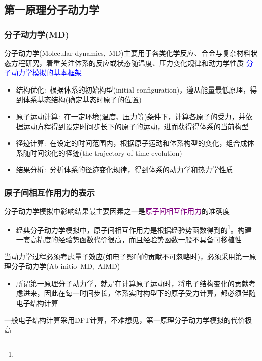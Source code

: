 \subsection{第一原理分子动力学}
\frame
{
	\frametitle{分子动力学\textrm{(MD)}}
	分子动力学\textrm{(Molecular dynamics,~MD)}主要用于各类化学反应、合金与复杂材料状态方程研究，着重关注体系的反应或状态随温度、压力变化规律和动力学性质
\vskip 5pt
\textcolor{blue}{分子动力学模拟的基本框架}
	\begin{itemize}
		\item 结构优化:~根据体系的初始构型\textrm{(initial configuration)}，遵从能量最低原理，得到体系基态结构(确定基态时原子的位置)
		\item 原子运动计算:~在一定环境(温度、压力等)条件下，计算各原子的受力，并依据运动方程得到设定时间步长下的原子的运动，进而获得得体系的当前构型
		\item 径迹计算:~在设定的时间范围内，根据原子运动和体系构型的变化，组合成体系随时间演化的径迹\textrm{(the trajectory of time evolution)}
		\item 结果分析:~分析体系的径迹变化规律，得到体系的动力学和热力学性质
	\end{itemize}
}

\frame
{
	\frametitle{原子间相互作用力的表示}
	分子动力学模拟中影响结果最主要因素之一是\textcolor{purple}{原子间相互作用力}的准确度
\vskip 5pt
\begin{itemize}
	\item 经典分子动力学模拟中，原子间相互作用力是根据经验势函数得到的\footnote{\fontsize{6.2pt}{4.2pt}\selectfont{经验势函数也称为力场，是参数化形式给出的原子间相互作用，一般通过对实验数据拟合或小体系的第一原理计算得到}}。构建一套高精度的经验势函数代价很高，而且经验势函数一般不具备可移植性
\end{itemize}
\vskip 5pt
	当动力学过程必须考虑量子效应(如电子影响的贡献不可忽略时)，必须采用第一原理分子动力学\textrm{(Ab initio~MD,~AIMD)}
	\begin{itemize}
		\item 所谓第一原理分子动力学，就是在计算原子运动时，将电子结构变化的贡献考虑进来，因此在每一时间步长，体系实时构型下的原子受力计算，都必须伴随电子结构计算
	\end{itemize}
	一般电子结构计算采用\textrm{DFT}计算，不难想见，第一原理分子动力学模拟的代价极高
}

